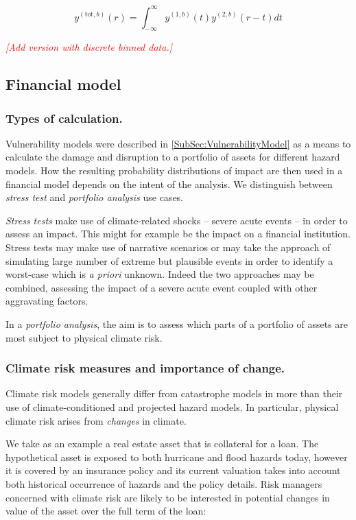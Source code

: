 \documentclass[a4paper,11pt]{extarticle} %
\begin{document}
\begin{equation}
    \label{Eq:sampling}
    y^{(\text{tot}, b)}(r) = \int^{\infty}_{-\infty} y^{(1, b)}(t) y^{(2, b)}(r - t) dt
\end{equation}

{\textcolor{red}{\emph{[Add version with discrete binned data.]}}}

\subsection{Financial model}

\subsubsection{Types of calculation.}
Vulnerability models were described in \ref{SubSec:VulnerabilityModel} as a means to calculate the damage and disruption to a portfolio of assets for different hazard models. How the resulting probability distributions of impact are then used in a financial model depends on the intent of the analysis. We distinguish between \emph{stress test} and \emph{portfolio analysis} use cases. 

\emph{Stress tests} make use of climate-related shocks -- severe acute events -- in order to assess an impact. This might for example be the impact on a financial institution. Stress tests may make use of narrative scenarios or may take the approach of simulating large number of extreme but plausible events in order to identify a worst-case which is \emph{a priori} unknown. Indeed the two approaches may be combined, assessing the impact of a severe acute event coupled with other aggravating factors.

In a \emph{portfolio analysis}, the aim is to assess which parts of a portfolio of assets are most subject to physical climate risk. 

\subsubsection{Climate risk measures and importance of change.}
Climate risk models generally differ from catastrophe models in more than their use of climate-conditioned and projected hazard models. In particular, physical climate risk arises from \emph{changes} in climate.

We take as an example a real estate asset that is collateral for a loan. The hypothetical asset is exposed to both hurricane and flood hazards today, however it is covered by an insurance policy and its current valuation takes into account both historical occurrence of hazards and the policy details. Risk managers concerned with climate risk are likely to be interested in potential changes in value of the asset over the full term of the loan:
\end{document}
